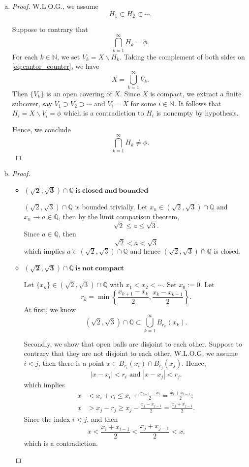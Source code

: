 \begin{Exercise}
\begin{enumerate}[a)]
\item
\begin{proof}
W.L.O.G., we assume
$$
H_1 \subset H_2 \subset \cdots.
$$

Suppose to contrary that
\begin{equation}\label{eq:cantor_counter}
\bigcap_{k=1}^{\infty}H_k = \phi.
\end{equation}
For each $k\in\mathbb{N}$, we set $V_k = X\backslash H_k$. Taking the complement of both sides on \eqref{eq:cantor_counter}, we have
$$
X = \bigcup_{k=1}^{\infty}V_k.
$$
Then $\{V_k\}$ is an open covering of $X$. Since $X$ is compact, we extract a finite subcover, say $V_1 \supset V_2 \supset \cdots$ and $V_i = X$ for some $i\in\mathbb{N}$. It follows that $H_i = X\backslash V_i = \phi$ which is a contradiction to $H_i$ is nonempty by hypothesis.

Hence, we conclude
$$
\bigcap_{k=1}^{\infty}H_k \neq \phi.
$$
\end{proof}

\item
\begin{proof}
\begin{itemize}
\item $\mathbf{(\sqrt{2}, \sqrt{3})\cap \mathbb{Q}\  is\ closed\ and\ bounded}$

$(\sqrt{2}, \sqrt{3})\cap \mathbb{Q}$ is bounded trivially. Let $x_n\in(\sqrt{2}, \sqrt{3})\cap \mathbb{Q}$ and $x_n\to a \in \mathbb{Q}$, then by the limit comparison theorem,
$$
\sqrt{2} \leq a \leq \sqrt{3}.
$$
Since $a\in\mathbb{Q}$, then
$$
\sqrt{2} < a < \sqrt{3}
$$
which implies $a\in(\sqrt{2}, \sqrt{3})\cap \mathbb{Q}$ and hence $(\sqrt{2}, \sqrt{3})\cap \mathbb{Q}$ is closed.

\item $\mathbf{(\sqrt{2}, \sqrt{3})\cap \mathbb{Q}\  is\ not\ compact}$

Let $\{x_n\}\in(\sqrt{2}, \sqrt{3})\cap \mathbb{Q}$ with $x_1<x_2<\cdots$. Set $x_0 := 0$. Let 
$$
r_k=\min\left\{\frac{x_{k+1}-x_k}{2}, \frac{x_k-x_{k-1}}{2}\right\}.
$$
At first, we know
$$
(\sqrt{2}, \sqrt{3})\cap \mathbb{Q} \subset \bigcup_{k=1}^{\infty} B_{r_k}(x_k).
$$

Secondly, we show that open balls are disjoint to each other. Suppose to contrary that they are not disjoint to each other, W.L.O.G, we assume $i<j$, then there is a point $x\in B_{r_i}(x_i)\cap B_{r_j}(x_j)$. Hence,
$$
\left| x-x_i \right| < r_i \text{ and } \left| x-x_j \right| < r_j.
$$
which implies
\begin{align*}
x &< x_i+r_i \leq x_i+\frac{x_{i-1}-x_i}{2} = \frac{x_i+x_{i-1}}{2}; \\
x &> x_j-r_j \geq x_j-\frac{x_j-x_{j-1}}{2} = \frac{x_j+x_{j-1}}{2}.
\end{align*}
Since the index $i<j$, and then
$$
x < \frac{x_i+x_{i-1}}{2} < \frac{x_j+x_{j-1}}{2} < x.
$$
which is a contradiction.


\end{itemize}
\end{proof}
\end{enumerate}
\end{Exercise}
